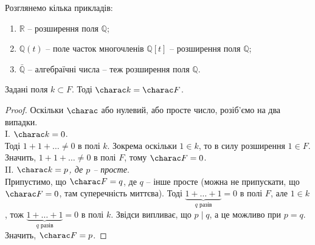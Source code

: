 \documentclass{math_library}
\begin{document}
\begin{example}
Розглянемо кілька прикладів:
\begin{enumerate}[nosep, wide=0pt, label={\arabic*.}]
\item $\mathbb{R}$ -- розширення поля $\mathbb{Q}$;

\item $\mathbb{Q}(t)$ -- поле часток многочленів $\mathbb{Q}[t]$ -- розширення поля $\mathbb{Q}$;
\item $\bar{\mathbb{Q}}$ -- алгебраїчні числа -- теж розширення поля $\mathbb{Q}$.
\end{enumerate}
\end{example}

\begin{proposition}
Задані поля $k \subset F$. Тоді $\charac k = \charac F$.
\end{proposition}

\begin{proof}
Оскільки $\charac$ або нулевий, або просте число, розіб'ємо на два випадки.\\
I. $\charac k = 0$. \\
Тоді $1 + 1 + \dots \neq 0$ в полі $k$. Зокрема оскільки $1 \in k$, то в силу розширення $1 \in F$. Значить, $1 + 1 + \dots \neq 0$ в полі $F$, тому $\charac F = 0$.
\bigskip \\
II. \textit{$\charac k = p$, де $p$ -- просте}. \\
Припустимо, що $\charac F = q$, де $q$ -- інше просте (можна не припускати, що $\charac F = 0$, там суперечність миттєва). Тоді $\underbrace{1+\dots+1}_{q \text{ разів}} = 0$ в полі $F$, але $1 \in k$, тож $\underbrace{1+\dots+1}_{q \text{ разів}} = 0$ в полі $k$. Звідси випливає, що $p \mid q$, а це можливо при $p = q$. Значить, $\charac F = p$.

\end{proof}
\end{document}
